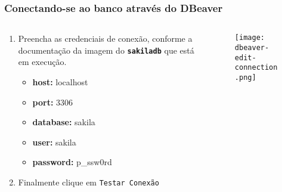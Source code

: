 \documentclass[t, 10pt, aspectratio=169, table, x11names]{beamer}
\begin{document}
	\begin{frame}
		\frametitle{Conectando-se ao banco através do DBeaver}
		\vspace{0.05cm}
		\begin{columns}[t]
			\begin{column}{0.50\linewidth}
				\centering
				\begin{enumerate}
					\small
					\setcounter{enumi}{3}
					\item Preencha as credenciais de conexão, conforme a documentação da imagem do \textbf{\texttt{sakiladb}} que está em execução.
					\begin{itemize}
						\item \textbf{host:} localhost
						\item \textbf{port:} 3306
						\item \textbf{database:} sakila
						\item \textbf{user:} sakila
						\item \textbf{password:} p\_ssw0rd
					\end{itemize}
					\vspace{0.15cm}
					\item Finalmente clique em \texttt{Testar Conexão}
				\end{enumerate}
			\end{column}
			\begin{column}{0.45\linewidth}
				\begin{figure}[h]
					\texttt{[image: dbeaver-edit-connection.png]}
				\end{figure}
			\end{column}
		\end{columns}
	\end{frame}
	
\end{document}
